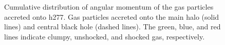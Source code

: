 \documentclass[manuscript]{aastex}
\begin{document}
\begin{figure}
\centerline{}
\caption[]{ Cumulative distribution of angular momentum of the gas particles accreted onto h277.  Gas particles accreted onto the main halo (solid lines) and central black hole (dashed lines). The green, blue, and red lines indicate clumpy, unshocked, and shocked gas, respectively.}
\label{h277angmom} 
\end{figure}
\end{document}
